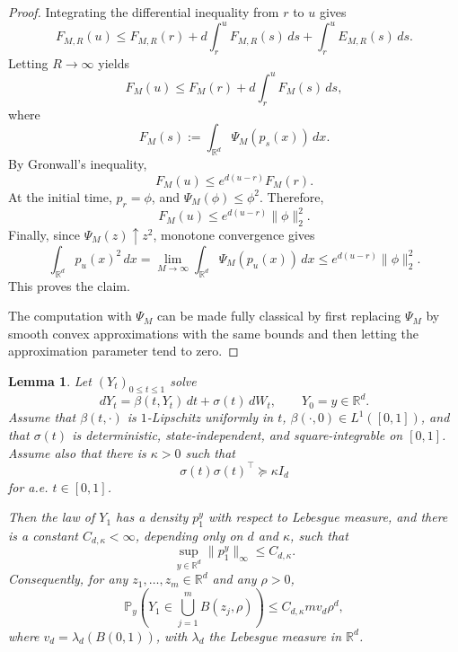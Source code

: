 \documentclass{article}
\newtheorem{lem}[thm]{Lemma}
\newcommand{\1}{\mathbbm{1}}
\numberwithin{equation}{section}
\def\to{\rightarrow}
\begin{document}
\begin{proof}
Integrating the differential inequality from $r$ to $u$ gives
\[
F_{M,R}(u)
\le
F_{M,R}(r)
+
d\int_r^u F_{M,R}(s)\,ds
+
\int_r^u E_{M,R}(s)\,ds.
\]
Letting $R\to\infty$ yields
\[
F_M(u)
\le
F_M(r)
+
d\int_r^u F_M(s)\,ds,
\]
where
\[
F_M(s):=\int_{\mathbb R^d}\Psi_M(p_s(x))\,dx.
\]
By Gronwall's inequality,
\[
F_M(u)\le e^{d(u-r)}F_M(r).
\]
At the initial time, $p_r=\phi$, and $\Psi_M(\phi)\le \phi^2$. Therefore,
\[
F_M(u)
\le
e^{d(u-r)}\|\phi\|_2^2.
\]
Finally, since $\Psi_M(z)\uparrow z^2$, monotone convergence gives
\[
\int_{\mathbb R^d}p_u(x)^2\,dx
=
\lim_{M\to\infty}
\int_{\mathbb R^d}\Psi_M(p_u(x))\,dx
\le
e^{d(u-r)}\|\phi\|_2^2.
\]
This proves the claim.

The computation with $\Psi_M$ can be made fully classical by first replacing
$\Psi_M$ by smooth convex approximations with the same bounds and then
letting the approximation parameter tend to zero.
\end{proof}
\begin{lem}
\label{lem:additive-anti-concentration}
Let $(Y_t)_{0\le t\le 1}$ solve
$$
dY_t=\beta(t,Y_t)\,dt+\sigma(t)\,dW_t,
\qquad
Y_0=y\in\mathbb R^d .
$$
Assume that $\beta(t,\cdot)$ is $1$-Lipschitz uniformly in $t$, $\beta(\cdot, 0)\in L^{1}([0, 1])$, and that
$\sigma(t)$ is deterministic, state-independent, and square-integrable on
$[0,1]$. Assume also that there is $\kappa>0$ such that
$$
\sigma(t)\sigma(t)^\top\succeq \kappa I_d
$$
for a.e. $t\in[0,1]$.

Then the law of $Y_1$ has a density $p_1^y$ with respect to Lebesgue measure,
and there is a constant $C_{d,\kappa}<\infty$, depending only on $d$ and
$\kappa$, such that
$$
\sup_{y\in\mathbb R^d}\|p_1^y\|_\infty\le C_{d,\kappa}.
$$
Consequently, for any $z_1,\ldots,z_m\in\mathbb R^d$ and any $\rho>0$,
$$
\mathbb P_y\left(
Y_1\in \bigcup_{j=1}^m B(z_j,\rho)
\right)
\le
C_{d,\kappa}m v_d\rho^d,
$$
where $v_d=\lambda_d(B(0,1))$, with $\lambda_{d}$ the Lebesgue measure in $\mathbb{R}^{d}$.
\end{lem}
\end{document}
